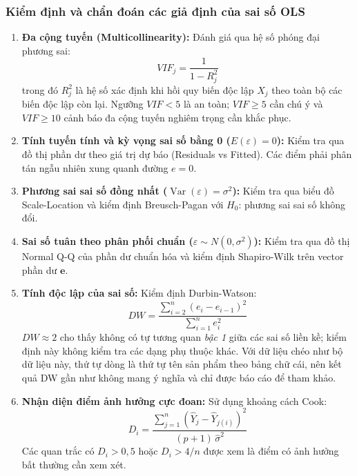 \documentclass[12pt,a4paper]{article}
\begin{document}
\subsubsection{Kiểm định và chẩn đoán các giả định của sai số OLS}
\begin{enumerate}
  \item \textbf{Đa cộng tuyến (Multicollinearity):} Đánh giá qua hệ số phóng đại phương sai:
  \begin{equation}
    VIF_j = \frac{1}{1 - R_j^2}
  \end{equation}
  trong đó $R_j^2$ là hệ số xác định khi hồi quy biến độc lập $X_j$ theo toàn bộ các biến độc
  lập còn lại. Ngưỡng $VIF < 5$ là an toàn; $VIF \ge 5$ cần chú ý và $VIF \ge 10$ cảnh báo đa
  cộng tuyến nghiêm trọng cần khắc phục.
  \item \textbf{Tính tuyến tính và kỳ vọng sai số bằng 0 ($E(\varepsilon) = 0$):} Kiểm tra qua đồ
  thị phần dư theo giá trị dự báo (Residuals vs Fitted). Các điểm phải phân tán ngẫu nhiên xung
  quanh đường $e = 0$.
  \item \textbf{Phương sai sai số đồng nhất ($\operatorname{Var}(\varepsilon) = \sigma^2$):} Kiểm tra
  qua biểu đồ Scale-Location và kiểm định Breusch-Pagan với $H_0$: phương sai sai số không đổi.
  \item \textbf{Sai số tuân theo phân phối chuẩn ($\varepsilon \sim N(0,\sigma^2)$):} Kiểm tra qua
  đồ thị Normal Q-Q của phần dư chuẩn hóa và kiểm định Shapiro-Wilk trên vector phần dư $\mathbf{e}$.
  \item \textbf{Tính độc lập của sai số:} Kiểm định Durbin-Watson:
  \begin{equation}
    DW = \frac{\sum_{i=2}^{n}(e_i - e_{i-1})^2}{\sum_{i=1}^{n} e_i^2}
  \end{equation}
  $DW \approx 2$ cho thấy không có tự tương quan \emph{bậc 1} giữa các sai số liền kề; kiểm
  định này không kiểm tra các dạng phụ thuộc khác. Với dữ liệu chéo như bộ dữ liệu này, thứ tự
  dòng là thứ tự tên sản phẩm theo bảng chữ cái, nên kết quả DW gần như không mang ý nghĩa và
  chỉ được báo cáo để tham khảo.
  \item \textbf{Nhận diện điểm ảnh hưởng cực đoan:} Sử dụng khoảng cách Cook:
  \begin{equation}
    D_i = \frac{\sum_{j=1}^{n}(\hat{Y}_j - \hat{Y}_{j(i)})^2}{(p+1)\,\hat{\sigma}^2}
  \end{equation}
  Các quan trắc có $D_i > 0{,}5$ hoặc $D_i > 4/n$ được xem là điểm có ảnh hưởng bất thường cần
  xem xét.
\end{enumerate}
\end{document}

